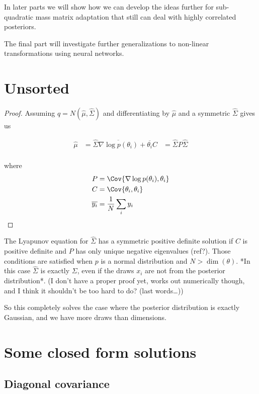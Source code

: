 \documentclass{scrartcl}
\begin{document}
In later parts we will show how we can develop the ideas further for
sub-quadratic mass matrix adaptation that still can deal with highly correlated
posteriors.

The final part will investigate further generalizations to non-linear
transformations using neural networks.

\iffalse
\section{Unsorted}

\begin{proof}
Assuming $q = N(\hat{\mu}, \hat{\Sigma})$ and differentiating by $\hat{\mu}$ and
a symmetric $\hat{\Sigma}$ gives us

\begin{align*}
\hat{\mu} &= \hat{\Sigma}\overline{\nabla \log p(\theta_i)} + \overline{\theta_i}
C &= \hat{\Sigma}P\hat{\Sigma} \\
\end{align*}

where
\begin{align*}
P &= \Cov{\nabla \log p(\theta_i), \theta_i} \\
C &= \Cov{\theta_i, \theta_i} \\
\overline{y_i} &= \frac{1}{N}\sum_i y_i
\end{align*}
\end{proof}

The Lyapunov equation for $\hat{\Sigma}$ has a symmetric positive definite solution if
$C$ is positive definite and $P$ has only unique negative eigenvalues (ref?).
Those conditions are satisfied when $p$ is a normal distribution and $N >
\dim(\theta)$. *In this case $\hat{\Sigma}$ is exactly $\Sigma$, even if
the draws $x_i$ are not from the posterior distribution*. (I don't have a
proper proof yet, works out numerically though, and I think it shouldn't be too
hard to do? (last words\ldots))

So this completely solves the case where the posterior distribution is exactly Gaussian,
and we have more draws than dimensions.

\section{Some closed form solutions}

\subsection{Diagonal covariance}
\end{document}
